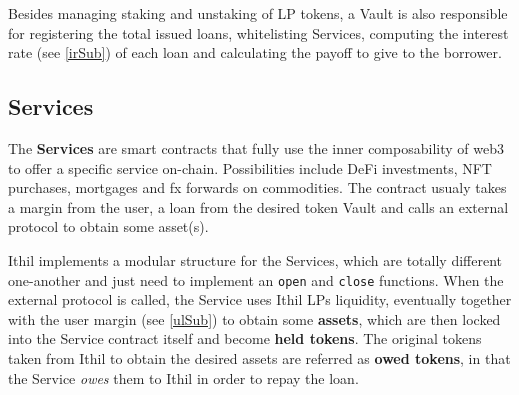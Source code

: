 \documentclass[a4paper,10 pt]{article}
\theoremstyle{definition}
\begin{document}
Besides managing staking and unstaking of LP tokens, a Vault is also responsible for registering the total issued loans, whitelisting Services, computing the interest rate (see \ref{irSub}) of each loan and calculating the payoff to give to the borrower.

\subsection{Services}\label{stratSub}

The {\bf Services} are smart contracts that fully use the inner composability of web3 to offer a specific service on-chain. Possibilities include DeFi investments, NFT purchases, mortgages and fx forwards on commodities.
The contract usualy takes a margin from the user, a loan from the desired token Vault and calls an external protocol to obtain some asset(s).

Ithil implements a modular structure for the Services, which are totally different one-another and just need to implement an \verb|open| and \verb|close| functions. When the external protocol is called, the Service uses Ithil LPs liquidity, eventually together with the user margin (see \ref{ulSub}) to obtain some {\bf assets}, which are then locked into the Service contract itself and become {\bf held tokens}. The original tokens taken from Ithil to obtain the desired assets are referred as {\bf owed tokens}, in that the Service {\it owes} them to Ithil in order to repay the loan.
\end{document}
